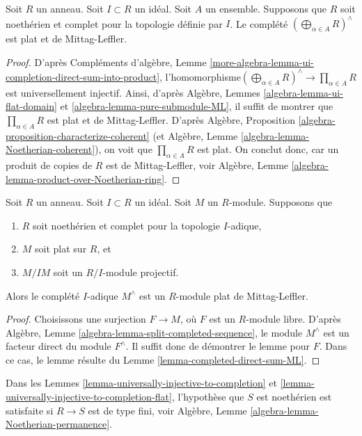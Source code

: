 \begin{lemma}
\label{lemma-completed-direct-sum-ML}
Soit $R$ un anneau. Soit $I \subset R$ un idéal. Soit $A$ un ensemble.
Supposons que $R$ soit noethérien et complet pour la topologie définie par $I$. Le complété
$(\bigoplus\nolimits_{\alpha \in A} R)^\wedge$
est plat et de Mittag-Leffler.
\end{lemma}

\begin{proof}
D'après
Compléments d'algèbre, Lemme
\ref{more-algebra-lemma-ui-completion-direct-sum-into-product},\newline
l'homomorphisme\newline $(\bigoplus\nolimits_{\alpha \in A} R)^\wedge
\to \prod_{\alpha \in A} R$ est universellement injectif.
Ainsi, d'après
Algèbre, Lemmes \ref{algebra-lemma-ui-flat-domain} et
\ref{algebra-lemma-pure-submodule-ML},
il suffit de montrer que $\prod_{\alpha \in A} R$ est plat et de Mittag-Leffler.
D'après
Algèbre, Proposition \ref{algebra-proposition-characterize-coherent}
(et
Algèbre, Lemme \ref{algebra-lemma-Noetherian-coherent}),
on voit que $\prod_{\alpha \in A} R$ est plat.
On conclut donc, car un produit de copies de $R$ est de Mittag-Leffler, voir
Algèbre, Lemme \ref{algebra-lemma-product-over-Noetherian-ring}.
\end{proof}

\begin{lemma}
\label{lemma-lift-ML}
Soit $R$ un anneau. Soit $I \subset R$ un idéal.
Soit $M$ un $R$-module.
Supposons que
\begin{enumerate}
\item $R$ soit noethérien et complet pour la topologie $I$-adique,
\item $M$ soit plat sur $R$, et
\item $M/IM$ soit un $R/I$-module projectif.
\end{enumerate}
Alors le complété $I$-adique $M^\wedge$ est un
$R$-module plat de Mittag-Leffler.
\end{lemma}

\begin{proof}
Choisissons une surjection $F \to M$, où $F$ est un $R$-module libre. D'après
Algèbre, Lemme \ref{algebra-lemma-split-completed-sequence},
le module $M^\wedge$ est un facteur direct du module $F^\wedge$.
Il suffit donc de démontrer le lemme pour $F$.
Dans ce cas, le lemme résulte du
Lemme \ref{lemma-completed-direct-sum-ML}.
\end{proof}

\noindent
Dans les
Lemmes \ref{lemma-universally-injective-to-completion} et
\ref{lemma-universally-injective-to-completion-flat},
l'hypothèse que $S$ est noethérien est satisfaite si $R \to S$ est de type fini, voir
Algèbre, Lemme \ref{algebra-lemma-Noetherian-permanence}.

